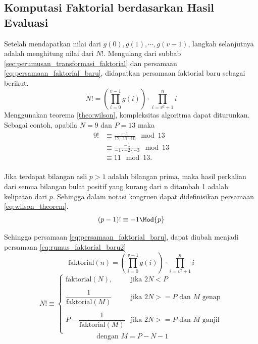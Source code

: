 \subsection{ Komputasi Faktorial berdasarkan Hasil Evaluasi}
\label{sec:komputasi_faktorial_multipoint}
Setelah mendapatkan nilai dari $ g(0), g(1), \cdots, g(v-1) $, langkah selanjutnya adalah menghitung nilai dari $ N! $. Mengulang dari subbab \ref{sec:perumusan_transformasi_faktorial} dan persamaan \eqref{eq:persamaan_faktorial_baru}, didapatkan persamaan faktorial baru sebagai berikut.
$$ N ! = \left( \prod_{i=0}^{v-1} g(i) \right) \cdot \prod_{i=v^2+1}^n i $$
Menggunakan teorema \ref{theo:wilson}, kompleksitas algoritma dapat diturunkan. Sebagai contoh, apabila $ N = 9 $ dan $ P = 13 $ maka 
\begin{equation}
	\begin{aligned}
	9! &\equiv \frac{-1}{12 \cdot 11 \cdot 10} \mod{13} \\
	   &\equiv \frac{-1}{-1 \cdot -2 \cdot -3} \mod{13} \\
	   &\equiv 11 \mod{13}. \\
	\end{aligned}
\end{equation}
\begin{theo}
	\label{theo:wilson}
	Jika terdapat bilangan asli $ p > 1 $ adalah bilangan prima, maka hasil perkalian dari semua bilangan bulat positif yang kurang dari n ditambah 1 adalah kelipatan dari $ p $. Sehingga dalam notasi kongruen dapat didefinisikan persamaan \eqref{eq:wilson_theorem}.
	\begin{equation}
		(p - 1)! \equiv -1 \Mod{p}
		\label{eq:wilson_theorem}
	\end{equation}
\end{theo}
Sehingga persamaan \eqref{eq:persamaan_faktorial_baru}, dapat diubah menjadi persamaan \eqref{eq:rumus_faktorial_baru2}
$$ \text{faktorial}(n) = \left( \prod_{i=0}^{v-1} g(i) \right) \cdot \prod_{i=v^2+1}^n i $$
\begin{equation}
	N! \equiv
	\begin{cases}
		\text{faktorial}(N), 	      & \text{jika } 2N < P \\\\
		\dfrac{1}{\text{faktorial}(M)}
		& \text{jika } 2N >= P \text{ dan } M \text{ genap}\\\\
		P -\dfrac{1}{\text{faktorial}(M)}
		& \text{jika } 2N >= P \text{ dan } M \text{ ganjil} \\
	\end{cases}
	\label{eq:rumus_faktorial_baru2}
\end{equation}
$$ \text{ dengan } M = P-N-1 $$

